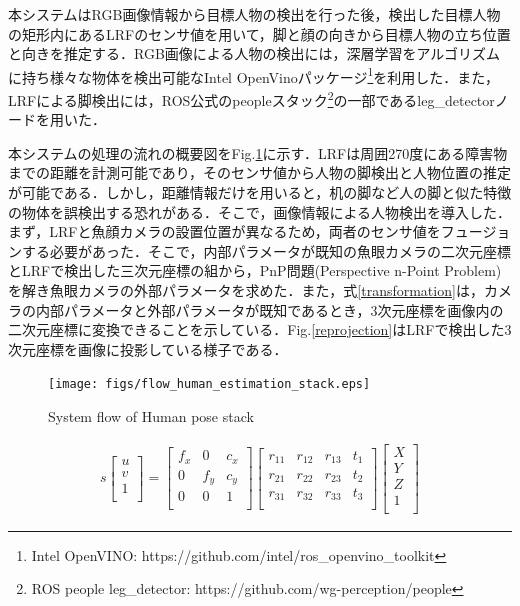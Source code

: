 \documentclass[12pt]{sonota/aislab}
\begin{document}
本システムはRGB画像情報から目標人物の検出を行った後，検出した目標人物の矩形内にあるLRFのセンサ値を用いて，脚と顔の向きから目標人物の立ち位置と向きを推定する．RGB画像による人物の検出には，深層学習をアルゴリズムに持ち様々な物体を検出可能なIntel OpenVinoパッケージ\footnote{Intel OpenVINO: https://github.com/intel/ros\_openvino\_toolkit}を利用した．また，LRFによる脚検出には，ROS公式のpeopleスタック\footnote{ROS people leg\_detector: https://github.com/wg-perception/people}の一部であるleg\_detectorノードを用いた．

本システムの処理の流れの概要図をFig.\ref{flow}に示す．LRFは周囲270度にある障害物までの距離を計測可能であり，そのセンサ値から人物の脚検出と人物位置の推定が可能である．しかし，距離情報だけを用いると，机の脚など人の脚と似た特徴の物体を誤検出する恐れがある．そこで，画像情報による人物検出を導入した．まず，LRFと魚顔カメラの設置位置が異なるため，両者のセンサ値をフュージョンする必要があった．そこで，内部パラメータが既知の魚眼カメラの二次元座標とLRFで検出した三次元座標の組から，PnP問題(Perspective n-Point Problem)を解き魚眼カメラの外部パラメータを求めた．また，式\ref{transformation}は，カメラの内部パラメータと外部パラメータが既知であるとき，3次元座標を画像内の二次元座標に変換できることを示している．Fig.\ref{reprojection}はLRFで検出した3次元座標を画像に投影している様子である．

\begin{figure}[t]
\begin{center}
\texttt{[image: figs/flow\_human\_estimation\_stack.eps]}
\caption{System flow of Human pose stack}
\label{flow}
\end{center}
\end{figure}

\begin{eqnarray}
s\left[
\begin{array}{ccc}
u \\
v \\
1 \\
\end{array}
\right]
=
\left[
\begin{array}{ccc}
f_{x} & 0 & c_{x} \\
0 & f_{y} & c_{y} \\
0 & 0 & 1 \\
\end{array}
\right]
\left[
\begin{array}{cccc}
r_{11} & r_{12} & r_{13} & t_{1} \\
r_{21} & r_{22} & r_{23} & t_{2} \\
r_{31} & r_{32} & r_{33} & t_{3} \\
\end{array}
\right]
\left[
\begin{array}{c}
X \\
Y \\
Z \\
1 \\
\end{array}
\right] \label{transformation}
\end{eqnarray}
\end{document}

